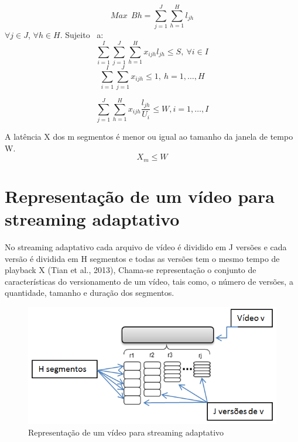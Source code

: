 \documentclass[
	12pt,				%
	oneside,			%
	a4paper,			%
	english,			%
	brazil				%
	]{abntex2ppgsi}
\begin{document}
\begin{equation}
Max  \ \ Bh=\sum_{j=1}^{J}\sum_{h=1}^{H}l_{jh}
\end{equation}\newline
$\forall j \in J$, $\forall h \in H.$
\newline
Sujeito \ a:
\begin{equation}
\sum_{i=1}^{I}\sum_{j=1}^{J}\sum_{h=1}^{H}x_{ijh}l_{jh} \leq S ,\ \forall i \in I
\end{equation}
\begin{equation}
\sum_{i=1}^{I}\sum_{j=1}^{J}x_{ijh} \leq 1 ,\ h = 1, \dots, H
\end{equation}

\begin{equation}
\sum_{j=1}^J\sum_{h=1}^{H}x_{ijh}\frac{l_{jh}}{U_i} \leq W ,i = 1, \dots, I
\end{equation}

A latência X dos m segmentos é menor ou igual ao tamanho da janela de tempo W.
\begin{equation}
X_m \leq W
\end{equation}


\section{Representação de um vídeo para streaming adaptativo}

No streaming adaptativo cada arquivo de vídeo é dividido em J versões e cada versão é dividida em H segmentos e todas as versões tem o mesmo tempo de playback X (Tian et al., 2013), Chama-se representação o conjunto de características do versionamento de um vídeo, tais como, o número de versões, a quantidade, tamanho e duração dos segmentos.


\begin{figure}[H]%
	\centering
 	  \caption{Representação de um vídeo para streaming adaptativo}
		\includegraphics{figuras/segmentos.png}
\end{figure}
\end{document}
